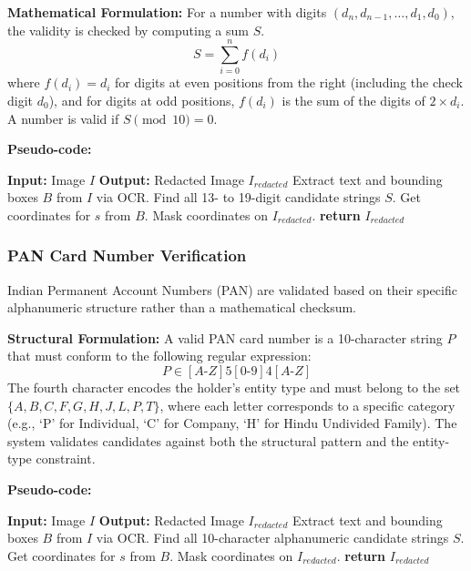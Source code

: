 \documentclass[conference]{IEEEtran}
\begin{document}
\textbf{Mathematical Formulation:} For a number with digits $(d_n, d_{n-1}, \dots, d_1, d_0)$, the validity is checked by computing a sum $S$.
\begin{equation}
S = \sum_{i=0}^{n} f(d_i)
\end{equation}
where $f(d_i) = d_i$ for digits at even positions from the right (including the check digit $d_0$), and for digits at odd positions, $f(d_i)$ is the sum of the digits of $2 \times d_i$. A number is valid if $S \pmod{10} = 0$.

\textbf{Pseudo-code:}
\begin{algorithmic}[1]
\STATE \textbf{Input:} Image $I$
\STATE \textbf{Output:} Redacted Image $I_{redacted}$
\STATE Extract text and bounding boxes $B$ from $I$ via OCR.
\STATE Find all 13- to 19-digit candidate strings $S$.
        \STATE Get coordinates for $s$ from $B$.
        \STATE Mask coordinates on $I_{redacted}$.
    \ENDIF
\ENDFOR
\STATE \textbf{return} $I_{redacted}$
\end{algorithmic}

\subsubsection{PAN Card Number Verification}
Indian Permanent Account Numbers (PAN) are validated based on their specific alphanumeric structure rather than a mathematical checksum.

\textbf{Structural Formulation:} A valid PAN card number is a 10-character string $P$ that must conform to the following regular expression:
\begin{equation}
P \in [A\text{-}Z]{5}[0\text{-}9]{4}[A\text{-}Z]
\end{equation}
The fourth character encodes the holder's entity type and must belong to the set $\{A, B, C, F, G, H, J, L, P, T\}$, where each letter corresponds to a specific category (e.g., `P' for Individual, `C' for Company, `H' for Hindu Undivided Family). The system validates candidates against both the structural pattern and the entity-type constraint.

\textbf{Pseudo-code:}
\begin{algorithmic}[1]
\STATE \textbf{Input:} Image $I$
\STATE \textbf{Output:} Redacted Image $I_{redacted}$
\STATE Extract text and bounding boxes $B$ from $I$ via OCR.
\STATE Find all 10-character alphanumeric candidate strings $S$.
        \STATE Get coordinates for $s$ from $B$.
        \STATE Mask coordinates on $I_{redacted}$.
    \ENDIF
\ENDFOR
\STATE \textbf{return} $I_{redacted}$
\end{algorithmic}
\end{document}
